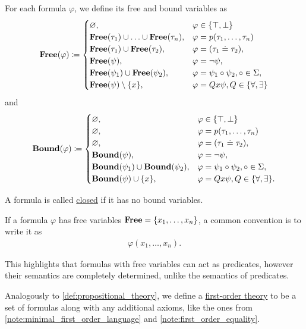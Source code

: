 \begin{definition}
  For each formula $\varphi$, we define its free and bound variables as
  \begin{align*}
    \operatorname{\mathbf{Free}}(\varphi) \coloneqq \begin{cases}
      \varnothing,                                              &\varphi \in \{ \top, \bot \} \\
      \operatorname{\mathbf{Free}}(\tau_1) \cup \ldots \cup \operatorname{\mathbf{Free}}(\tau_n), &\varphi = p(\tau_1, \ldots, \tau_n) \\
      \operatorname{\mathbf{Free}}(\tau_1) \cup \operatorname{\mathbf{Free}}(\tau_2),             &\varphi = (\tau_1 \doteq \tau_2), \\
      \operatorname{\mathbf{Free}}(\psi),                                        &\varphi = \neg \psi, \\
      \operatorname{\mathbf{Free}}(\psi_1) \cup \operatorname{\mathbf{Free}}(\psi_2),             &\varphi = \psi_1 \circ \psi_2, \circ \in \Sigma, \\
      \operatorname{\mathbf{Free}}(\psi) \setminus \{ x \},                      &\varphi = Q x \psi, Q \in \{ \forall, \exists \}
    \end{cases}
  \end{align*}
  and
  \begin{align*}
    \operatorname{\mathbf{Bound}}(\varphi) \coloneqq \begin{cases}
      \varnothing,                                              &\varphi \in \{ \top, \bot \} \\
      \varnothing,                                              &\varphi = p(\tau_1, \ldots, \tau_n) \\
      \varnothing,                                              &\varphi = (\tau_1 \doteq \tau_2), \\
      \operatorname{\mathbf{Bound}}(\psi),                                       &\varphi = \neg \psi, \\
      \operatorname{\mathbf{Bound}}(\psi_1) \cup \operatorname{\mathbf{Bound}}(\psi_2),           &\varphi = \psi_1 \circ \psi_2, \circ \in \Sigma, \\
      \operatorname{\mathbf{Bound}}(\psi) \cup \{ x \},                          &\varphi = Q x \psi, Q \in \{ \forall, \exists \}.
    \end{cases}
  \end{align*}

  A formula is called \ul{closed} if it has no bound variables.

  If a formula $\varphi$ has free variables $\operatorname{\mathbf{Free}} = \{ x_1, \ldots, x_n \}$, a common convention is to write it as
  \begin{align*}
    \varphi(x_1, \ldots, x_n).
  \end{align*}

  This highlights that formulas with free variables can act as predicates, however their semantics are completely determined, unlike the semantics of predicates.

  Analogously to \cref{def:propositional_theory}, we define a \ul{first-order theory} to be a set of formulas along with any additional axioms, like the ones from \cref{note:minimal_first_order_language} and \cref{note:first_order_equality}.
\end{definition}

